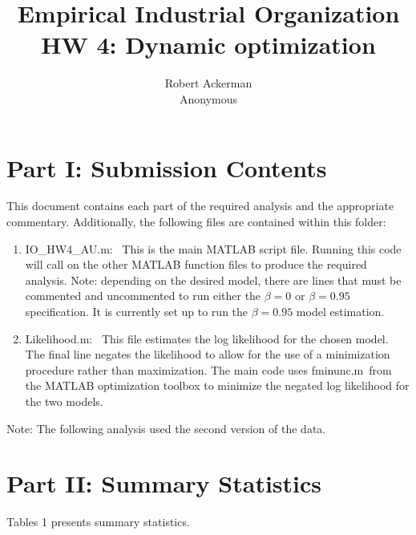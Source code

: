 \documentclass[11pt]{article}
\title{Empirical Industrial Organization \\ HW 4: Dynamic optimization}
\author{Robert Ackerman \\ Anonymous}
\begin{document}
\setlength{\pdfpagewidth}{8.5in}
\setlength{\pdfpageheight}{11in}
\maketitle

\section*{Part I: Submission Contents}

\indent

This document contains each part of the required analysis and the appropriate commentary.  Additionally, the following files are contained within this folder:  

\begin{enumerate}
\item  \footnotesize{IO\_HW4\_AU.m}\normalsize : \ This is the main MATLAB script file.  Running this code will call on the other MATLAB function files to produce the required analysis.  Note: depending on the desired model, there are lines that must be commented and uncommented to run either the $\beta=0$ or $\beta=0.95$ specification.  It is currently set up to run the $\beta=0.95$ model estimation. 

\item  \footnotesize{Likelihood.m}\normalsize : \ This file estimates the log likelihood for the chosen model.  The final line negates the likelihood to allow for the use of a minimization procedure rather than maximization.  The main code uses  \footnotesize{fminunc.m}\normalsize \ from the MATLAB optimization toolbox to minimize the negated log likelihood for the two models. 
\end{enumerate}

Note: The following analysis used the second version of the data.

\section*{Part II: Summary Statistics}

\indent

Tables 1 presents summary statistics.
\end{document}
